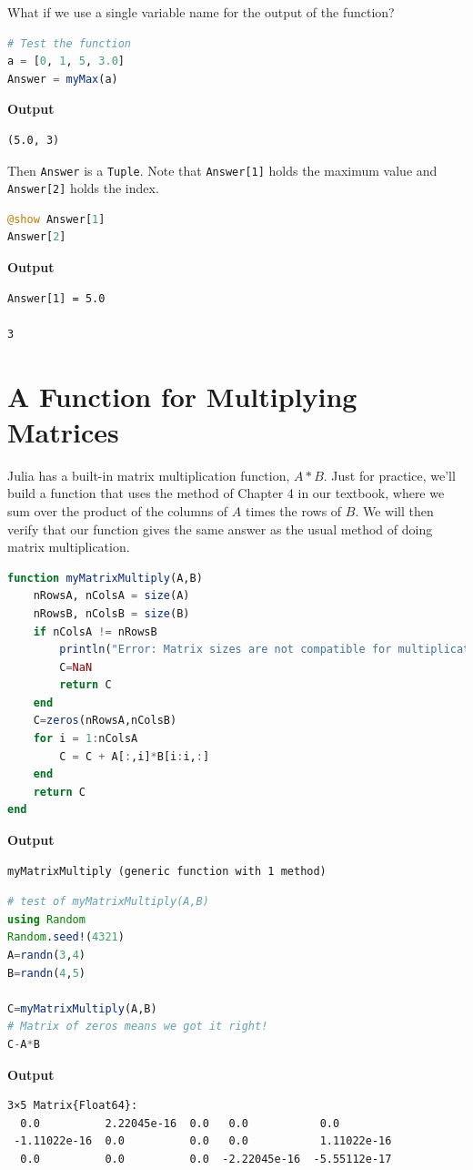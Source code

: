 What if we use a single variable name for the output of the function? 
\begin{lstlisting}[language=Julia,style=mystyle]
# Test the function
a = [0, 1, 5, 3.0]
Answer = myMax(a)
\end{lstlisting}
\textbf{Output} 
\begin{verbatim}
(5.0, 3)
\end{verbatim}

Then \texttt{Answer} is a \texttt{Tuple}. Note that \texttt{Answer[1]} holds the maximum value and \texttt{Answer[2]} holds the index.\\

\begin{lstlisting}[language=Julia,style=mystyle]
@show Answer[1]
Answer[2]
\end{lstlisting}
\textbf{Output} 
\begin{verbatim}
Answer[1] = 5.0

3
\end{verbatim}

\section{A Function for Multiplying Matrices}

Julia has a built-in matrix multiplication function, $A*B$. Just for practice, we'll build a function that uses the method of Chapter 4 in our textbook, where we sum over the product of the columns of $A$ times the rows of $B$.  We will then verify that our function gives the same answer as the usual method of doing matrix multiplication. 

\begin{lstlisting}[language=Julia,style=mystyle]
function myMatrixMultiply(A,B)
    nRowsA, nColsA = size(A)
    nRowsB, nColsB = size(B)
    if nColsA != nRowsB
        println("Error: Matrix sizes are not compatible for multiplication")
        C=NaN
        return C
    end
    C=zeros(nRowsA,nColsB)
    for i = 1:nColsA
        C = C + A[:,i]*B[i:i,:]
    end
    return C
end
\end{lstlisting}
\textbf{Output} 
\begin{verbatim}
myMatrixMultiply (generic function with 1 method)
\end{verbatim}


\begin{lstlisting}[language=Julia,style=mystyle]
# test of myMatrixMultiply(A,B)
using Random
Random.seed!(4321)
A=randn(3,4)
B=randn(4,5)

C=myMatrixMultiply(A,B)
# Matrix of zeros means we got it right!
C-A*B  
\end{lstlisting}
\textbf{Output} 
\begin{verbatim}
3×5 Matrix{Float64}:
  0.0          2.22045e-16  0.0   0.0           0.0
 -1.11022e-16  0.0          0.0   0.0           1.11022e-16
  0.0          0.0          0.0  -2.22045e-16  -5.55112e-17
\end{verbatim}


